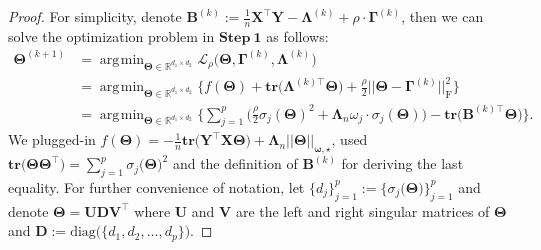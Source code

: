 \documentclass[12pt]{article}
\DeclareMathOperator*{\argmin}{\arg\!\min}
\begin{document}
\begin{proof}
For simplicity, denote $\boldsymbol{B}^{(k)}:=\frac{1}{n}\boldsymbol{X}^{\top}\boldsymbol{Y}-\boldsymbol{\Lambda}^{(k)}+\rho \cdot \boldsymbol{\Gamma}^{(k)}$, then we can solve the optimization problem in $\textbf{Step}\ \boldsymbol{1}$ as follows:
\begin{align}
    \boldsymbol{\Theta}^{(k+1)} 
    &= \argmin_{\boldsymbol{\Theta}\in\mathbb{R}^{d_{1} \times d_{2}}} \mathcal{L}_{\rho} \big( \boldsymbol{\Theta},\boldsymbol{\Gamma}^{(k)},\boldsymbol{\Lambda}^{(k)} \big) \nonumber \\
    &= \argmin_{\boldsymbol{\Theta}\in\mathbb{R}^{d_{1} \times d_{2}}}  \bigg\{ f(\boldsymbol{\Theta}) + \textbf{tr}\big(\boldsymbol{\Lambda}^{(k) \top}\boldsymbol{\Theta}\big) + \frac{\rho}{2} || \boldsymbol{\Theta}-\boldsymbol{\Gamma}^{(k)} ||_{\text{F}}^{2} \bigg\}  \nonumber \\
    &= \argmin_{\boldsymbol{\Theta}\in\mathbb{R}^{d_{1} \times d_{2}}} \bigg\{ \sum_{j=1}^{p} \bigg( \frac{\rho}{2}\sigma_{j}(\boldsymbol{\Theta})^{2} + \boldsymbol{\Lambda}_{n} \omega_{j} \cdot\sigma_{j}(\boldsymbol{\Theta}) \bigg) -\textbf{tr} \big( \boldsymbol{B}^{(k) \top}\boldsymbol{\Theta} \big) \bigg\} \label{eq: step1_orig}.
\end{align}
We plugged-in $f(\boldsymbol{\Theta})=-\frac{1}{n}\textbf{tr}\big( \boldsymbol{Y}^{\top}\boldsymbol{X}\boldsymbol{\Theta} \big)+\boldsymbol{\Lambda}_{n}||\boldsymbol{\Theta}||_{\boldsymbol{\omega,\star}}$, 
used $\textbf{tr}\big(\boldsymbol{\Theta}\boldsymbol{\Theta}^{\top}\big)=\sum_{j=1}^{p}\sigma_{j}\big(\boldsymbol{\Theta}\big)^{2}$ and the definition of $\boldsymbol{B}^{(k)}$ for deriving the last equality.
For further convenience of notation, let $\{d_{j}\}_{j=1}^{p}:=\{\sigma_{j}\big(\boldsymbol{\Theta}\big)\}_{j=1}^{p}$ and 
denote $\boldsymbol{\Theta}=\boldsymbol{UDV^{\top}}$ where 
$\boldsymbol{U}$ and $\boldsymbol{V}$ are the left and right singular matrices of $\boldsymbol{\Theta}$ and $\boldsymbol{D}:=\text{diag}\big(\{d_{1},d_{2},\dots,d_{p}\}\big)$.

\end{proof}
\end{document}
